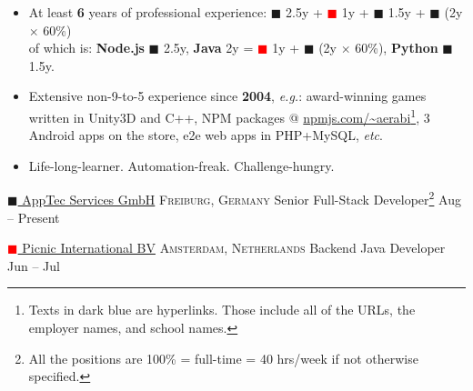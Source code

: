 \documentclass[10pt,a4paper]{article}
\newcommand{\colorsquare}[1]{\textcolor{#1}{$\blacksquare$}}
\begin{document}
\begin{itemize}
    \item At least \textbf{6} years of professional experience:
      \colorsquare{frenchblue} 2.5y +
      \colorsquare{red} 1y +
      \colorsquare{bazaar} 1.5y +
      \colorsquare{camouflagegreen} (2y $\times$ 60\%) \\
        of which is:
        \textbf{Node.js} \colorsquare{frenchblue} 2.5y,
        \textbf{Java} 2y = \colorsquare{red} 1y + \colorsquare{camouflagegreen} (2y $\times$ 60\%),
        \textbf{Python} \colorsquare{bazaar} 1.5y.
    
    \item Extensive non-9-to-5 experience since \textbf{2004}, \textit{e.g.}:
    award-winning games written in Unity3D and C++,
    NPM packages @ \href{https://www.npmjs.com/~aerabi}{\url{npmjs.com/~aerabi}}\footnote{Texts in dark blue are hyperlinks. Those include all of the URLs, the employer names, and school names.}, 3 Android apps on the store, e2e web apps in PHP+MySQL, \textit{etc}.
    
    \item Life-long-learner. Automation-freak. Challenge-hungry.
\end{itemize}

\spacedhrule{-0.2em}{-0.4em}


\headedsection
  {\href{https://www.apptec360.com/}{\colorsquare{frenchblue} AppTec Services GmbH}}
  {\textsc{Freiburg, Germany}} {%
  \headedsubsection
    {Senior Full-Stack Developer\footnote{All the positions are 100\% = full-time = 40 hrs/week if not otherwise specified.}}
    {Aug  -- Present}
    {}
}

\headedsection
  {\href{https://picnic.app/}{\colorsquare{red} Picnic International BV}}
  {\textsc{Amsterdam, Netherlands}} {%
  \headedsubsection
    {Backend Java Developer}
    {Jun  -- Jul }
    {}
}
\end{document}
